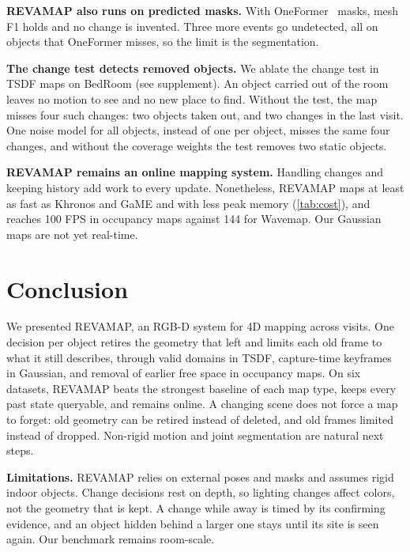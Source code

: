 \documentclass[10pt,twocolumn,letterpaper]{article}
\newcommand{\ours}{REVAMAP\xspace}
\begin{document}
\noindent\textbf{\ours also runs on predicted masks.}
With OneFormer~\cite{Jain_2023_CVPR} masks, mesh F1 holds and no change is invented. Three more events go undetected, all on objects that OneFormer misses, so the limit is the segmentation.





\noindent\textbf{The change test detects removed objects.}
We ablate the change test in TSDF maps on BedRoom (see supplement). An object carried out of the room leaves no motion to see and no new place to find. Without the test, the map misses four such changes: two objects taken out, and two changes in the last visit. One noise model for all objects, instead of one per object, misses the same four changes, and without the coverage weights the test removes two static objects.

\noindent\textbf{\ours remains an online mapping system.}\label{sec:cost}
Handling changes and keeping history add work to every update. Nonetheless, \ours maps at least as fast as Khronos and GaME and with less peak memory (\cref{tab:cost}), and reaches 100 FPS in occupancy maps against 144 for Wavemap. Our Gaussian maps are not yet real-time.



\section{Conclusion}
\label{sec:conclusion}

We presented \ours, an RGB-D system for 4D mapping across visits. One decision per object retires the geometry that left and limits each old frame to what it still describes, through valid domains in TSDF, capture-time keyframes in Gaussian, and removal of earlier free space in occupancy maps. On six datasets, \ours beats the strongest baseline of each map type, keeps every past state queryable, and remains online. A changing scene does not force a map to forget: old geometry can be retired instead of deleted, and old frames limited instead of dropped. Non-rigid motion and joint segmentation are natural next steps.

\noindent\textbf{Limitations.}
%
\ours relies on external poses and masks and assumes rigid indoor objects. Change decisions rest on depth, so lighting changes affect colors, not the geometry that is kept. A change while away is timed by its confirming evidence, and an object hidden behind a larger one stays until its site is seen again. Our benchmark remains room-scale.
\end{document}
